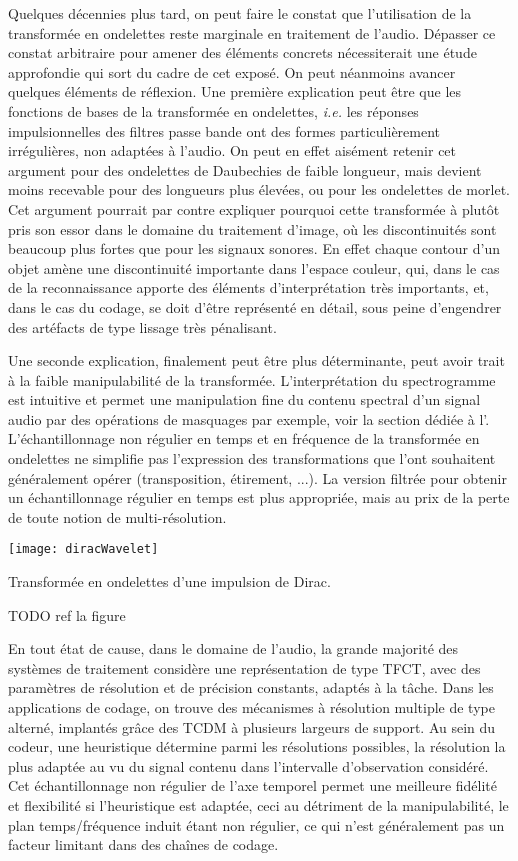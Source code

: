 Quelques décennies plus tard, on peut faire le constat que l'utilisation de la transformée en ondelettes reste marginale en traitement de l'audio. Dépasser ce constat arbitraire pour amener des éléments concrets nécessiterait une étude approfondie qui sort du cadre de cet exposé. On peut néanmoins avancer quelques éléments de réflexion. Une première explication peut être que les fonctions de bases de la transformée en ondelettes, \textit{i.e.} les réponses impulsionnelles des filtres passe bande ont des formes particulièrement irrégulières, non adaptées à l'audio. On peut en effet aisément retenir cet argument pour des ondelettes de Daubechies de faible longueur, mais devient moins recevable pour des longueurs plus élevées, ou pour les ondelettes de morlet. Cet argument pourrait par contre expliquer pourquoi cette transformée à plutôt pris son essor dans le domaine du traitement d'image, où les discontinuités sont beaucoup plus fortes que pour les signaux sonores. En effet chaque contour d'un objet amène une discontinuité importante dans l'espace couleur, qui, dans le cas de la reconnaissance apporte des éléments d'interprétation très importants, et, dans le cas du codage, se doit d'être représenté en détail, sous peine d'engendrer des artéfacts de type \og lissage \fg très pénalisant.

Une seconde explication, finalement peut être plus déterminante, peut avoir trait à la faible manipulabilité de la transformée. L'interprétation  du spectrogramme est intuitive et permet une manipulation fine du contenu spectral d'un signal audio par des opérations de masquages par exemple, voir la section dédiée à l'. L'échantillonnage non régulier en temps et en fréquence de la transformée en ondelettes ne simplifie pas l'expression des transformations que l'ont souhaitent généralement opérer (transposition, étirement, ...). La version filtrée pour obtenir un échantillonnage régulier en temps est plus appropriée, mais au prix de la perte de toute notion de multi-résolution.

\begin{marginfigure}
  \texttt{[image: diracWavelet]}
  \label{fig:dirac}
  \caption{Transformée en ondelettes d'une impulsion de Dirac.}
  TODO ref la figure
\end{marginfigure}

En tout état de cause, dans le domaine de l'audio, la grande majorité des systèmes de traitement considère une représentation de type TFCT, avec des paramètres de résolution et de précision constants, adaptés à la tâche. Dans les applications de codage, on trouve des mécanismes à résolution multiple de type alterné, implantés grâce des TCDM à plusieurs largeurs de support\cite{brandenburg1999mp3}. Au sein du codeur, une heuristique détermine parmi les résolutions possibles, la résolution la plus adaptée au vu du signal contenu dans l'intervalle d'observation considéré. Cet échantillonnage non régulier de l'axe temporel permet une meilleure fidélité et flexibilité si l'heuristique est adaptée, ceci au détriment de la manipulabilité, le plan temps/fréquence induit étant non régulier, ce qui n'est généralement pas un facteur limitant dans des chaînes de codage.

